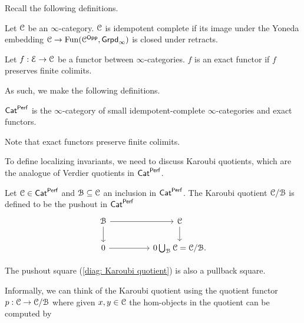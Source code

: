Recall the following definitions. 
\begin{definition}\label{def: idempotent complete}
    Let $\EuScript{C}$ be an $\infty$-category. $\EuScript{C}$ is idempotent complete if its image under the Yoneda embedding $\EuScript{C}\to\mathrm{Fun}(\EuScript{C}^{\mathsf{Opp}},\mathsf{Grpd}_{\infty})$ is closed under retracts. 
\end{definition}
\begin{definition}\label{def: exact functor}
    Let $f:\EuScript{E}\to\EuScript{C}$ be a functor between $\infty$-categories. $f$ is an exact functor if $f$ preserves finite colimits. 
\end{definition}
As such, we make the following definitions. 
\begin{definition}[$\Cat^{\Perf}$]\label{def: CatPerf}
    $\Cat^{\Perf}$ is the $\infty$-category of small idempotent-complete $\infty$-categories and exact functors. 
\end{definition}
\begin{remark}
    Note that exact functors preserve finite colimits. 
\end{remark}
To define localizing invariants, we need to discuss Karoubi quotients, which are the analogue of Verdier quotients in $\Cat^{\Perf}$. 
\begin{definition}\label{def: Karoubi quotient}
    Let $\EuScript{C}\in\mathsf{Cat}^{\mathsf{Perf}}$ and $\EuScript{B}\subseteq\EuScript{C}$ an inclusion in $\Cat^{\Perf}$. The Karoubi quotient $\EuScript{C}/\EuScript{B}$ is defined to be the pushout in $\Cat^{\Perf}$
    \begin{equation}\label{diag: Karoubi quotient}
    \begin{tikzcd}
        \Bscr && \Cscr \\
        0 && {0\bigcup_{\Bscr}\Cscr=\Cscr/\Bscr.}
        \arrow[from=1-1, to=1-3]
        \arrow[from=1-1, to=2-1]
        \arrow[from=1-3, to=2-3]
        \arrow[from=2-1, to=2-3]
    \end{tikzcd}
    \end{equation}
\end{definition}
\begin{remark}
    The pushout square (\ref{diag: Karoubi quotient}) is also a pullback square. 
\end{remark}
Informally, we can think of the Karoubi quotient using the quotient functor $p:\EuScript{C}\to\EuScript{C}/\EuScript{B}$ where given $x,y\in\EuScript{C}$ the hom-objects in the quotient can be computed by 
